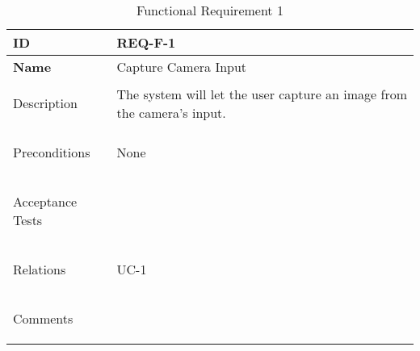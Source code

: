 \begin{table}[H]
    \begin{tabular}[t]{ | >{\bfseries}l | p{9.5cm} |}

    \hline
    ID
    &  REQ-F-1 \\ \hline

    Name
    & Capture Camera Input \\ \hline

    Description
    &  The system will let the user capture an image from the camera's input. \\ \hline

    Preconditions
    & None \\ \hline

    Acceptance Tests
    & \\ \hline

    Relations
    & UC-1 \\ \hline

    Comments
    &  \\ \hline

    \end{tabular}

    \caption{Functional Requirement 1}
    \label{fig:req_f_1}

\end{table}